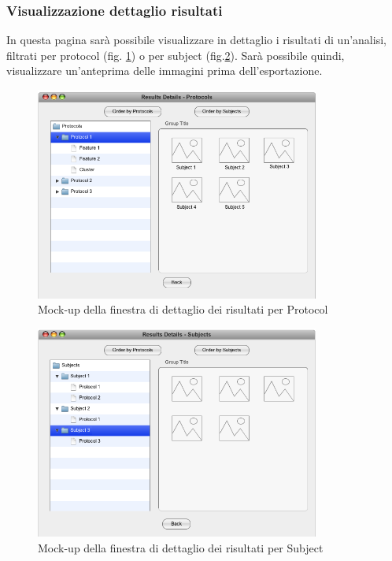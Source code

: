 \subsubsection{Visualizzazione dettaglio risultati}
In questa pagina sarà possibile visualizzare in dettaglio i risultati di un'analisi, filtrati per protocol\glossario{} (fig. \ref{detail_results-protocol}) o per subject\glossario{} (fig.\ref{detail_results-subject}). Sarà possibile quindi, visualizzare un'anteprima delle immagini prima dell'esportazione.
\begin{figure}[htp]
	\centering
	\includegraphics[width=0.80\linewidth,height=7cm]{./Content/Immagini/Prototype-v0.1/filesystemdoc_8_13}
	\caption{Mock-up della finestra di dettaglio dei risultati per Protocol}
	\label{detail_results-protocol}
\end{figure}
\pagebreak
\begin{figure}[!h]
	\centering
	\includegraphics[width=0.8\linewidth,height=7cm]{./Content/Immagini/Prototype-v0.1/filesystemdoc_8_14}
	\caption{Mock-up della finestra di dettaglio dei risultati per Subject}
	\label{detail_results-subject}
\end{figure}